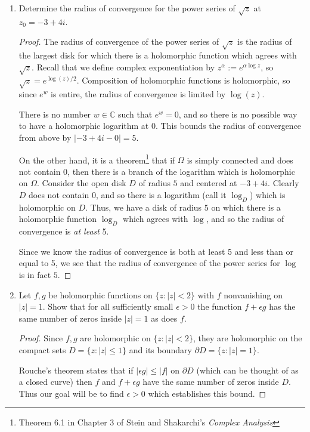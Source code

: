 \documentclass{article}
\begin{document}
\begin{enumerate}
	\item Determine the radius of convergence for the power series of $\sqrt{z}$ at $z_0 = -3 + 4i$.
	
	\begin{proof}
	The radius of convergence of the power series of $\sqrt{z}$ is the radius of the largest disk for which there is a holomorphic function which agrees with $\sqrt{z}$.
	Recall that we define complex exponentiation by $z^\alpha := e^{\alpha \log z}$, so $\sqrt{z} = e^{\log(z)/2}$. Composition of holomorphic functions is holomorphic, so since $e^w$ is entire, the radius of convergence is limited by $\log(z)$. 
	
	There is no number $w \in \mathbb{C}$ such that $e^w = 0$, and so there is no possible way to have a holomorphic logarithm at $0$. This bounds the radius of convergence from above by $|-3 + 4i - 0|=5$. 
	
	On the other hand, it is a theorem\footnote{Theorem 6.1 in Chapter 3 of Stein and Shakarchi's \textit{Complex Analysis}} that if $\Omega$ is simply connected and does not contain $0$, then there is a branch of the logarithm which is holomorphic on $\Omega$. Consider the open disk $D$ of radius $5$ and centered at $-3 + 4i$. Clearly $D$ does not contain $0$, and so there is a logarithm (call it $\log_D$) which is holomorphic on $D$. Thus, we have a disk of radius $5$ on which there is a holomorphic function $\log_D$ which agrees with $\log$, and so the radius of convergence is \textit{at least} 5. 
	
	Since we know the radius of convergence is both at least 5 and less than or equal to 5, we see that the radius of convergence of the power series for $\log$ is in fact $5$.
	
	\end{proof}
	
	\item Let $f,g$ be holomorphic functions on $\{z : |z| < 2\}$ with $f$ nonvanishing on $|z| = 1$. Show that for all sufficiently small $\epsilon>0$ the function $f+ \epsilon g$ has the same number of zeros inside $|z| = 1$ as does $f$. 
	
	\begin{proof}
		Since $f,g$ are holomorphic on $\{ z: |z| < 2\}$, they are holomorphic on the compact sets $D = \{z : |z | \leq 1\}$ and its boundary $\partial D =\{z : |z| = 1\}$.
		
		Rouche's theorem states that if $|\epsilon g| \leq |f|$ on $\partial D$ (which can be thought of as a closed curve) then $f$ and $f+ \epsilon g$ have the same number of zeros inside $D$. 
		Thus our goal will be to find $\epsilon > 0$ which establishes this bound.
		

\end{proof}
\end{enumerate}
\end{document}
